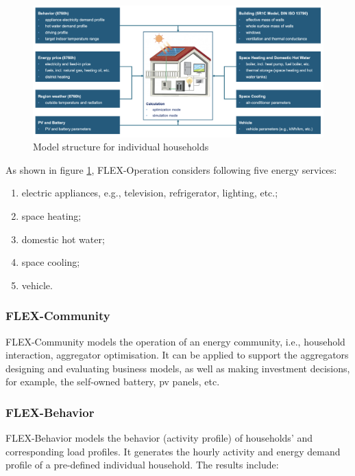 \begin{figure}[h]
  \centering
  \includegraphics[width=\textwidth]{Images/flex-operation.png}
  \caption{Model structure for individual households}
  \label{fig:flex-operation}
\end{figure}

As shown in figure \ref{fig:flex-operation}, FLEX-Operation considers following five energy services:

\begin{enumerate}
  \item electric appliances, e.g., television, refrigerator, lighting, etc.;
  \item space heating;
  \item domestic hot water;
  \item space cooling;
  \item vehicle. 
\end{enumerate}


\subsubsection{FLEX-Community}


FLEX-Community models the operation of an energy community, i.e., household interaction, aggregator optimisation. 
It can be applied to support the aggregators designing and evaluating business models, as well as making investment decisions, for example, the self-owned battery, \gls{pv} panels, etc.


\subsubsection{FLEX-Behavior}


FLEX-Behavior models the behavior (activity profile) of households' and corresponding load profiles. 
It generates the hourly activity and energy demand profile of a pre-defined individual household. 
The results include: 

